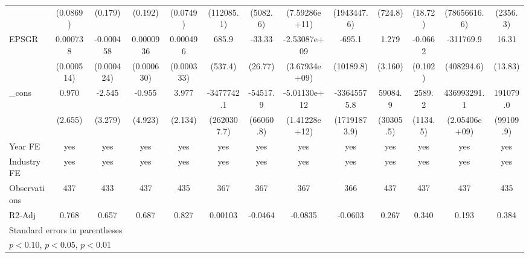 \begin{table}[htbp]
\begin{tabular}{l*{12}{c}}
                    &    (0.0869)         &     (0.179)         &     (0.192)         &    (0.0749)         &  (112085.1)         &    (5082.6)         &(7.59286e+11)         & (1943447.6)         &     (724.8)         &     (18.72)         &(78656616.6)         &    (2356.3)         \\
EPSGR               &    0.000738         &   -0.000458         &   0.0000936         &    0.000496         &       685.9         &      -33.33         &-2.53087e+09         &      -695.1         &       1.279         &     -0.0662         &   -311769.9         &       16.31         \\
                    &  (0.000514)         &  (0.000424)         &  (0.000630)         &  (0.000333)         &     (537.4)         &     (26.77)         &(3.67934e+09)         &   (10189.8)         &     (3.160)         &     (0.102)         &  (408294.6)         &     (13.83)         \\
\_cons              &       0.970         &      -2.545         &      -0.955         &       3.977\sym{*}  &  -3477742.1         &    -54517.9         &-5.01130e+12\sym{***}& -33645575.8\sym{*}  &     59084.9\sym{*}  &      2589.2\sym{**} & 436993291.1         &    191079.0\sym{*}  \\
                    &     (2.655)         &     (3.279)         &     (4.923)         &     (2.134)         & (2620307.7)         &   (66060.8)         &(1.41228e+12)         &(17191873.9)         &   (30305.5)         &    (1134.5)         &(2.05406e+09)         &   (99109.9)         \\
\hline
Year FE             &         yes         &         yes         &         yes         &         yes         &         yes         &         yes         &         yes         &         yes         &         yes         &         yes         &         yes         &         yes         \\
Industry FE         &         yes         &         yes         &         yes         &         yes         &         yes         &         yes         &         yes         &         yes         &         yes         &         yes         &         yes         &         yes         \\
Observations        &         437         &         433         &         437         &         435         &         367         &         367         &         367         &         366         &         437         &         437         &         437         &         435         \\
R2-Adj              &       0.768         &       0.657         &       0.687         &       0.827         &     0.00103         &     -0.0464         &     -0.0835         &     -0.0603         &       0.267         &       0.340         &       0.193         &       0.384         \\
\hline\hline
\multicolumn{13}{l}{\footnotesize Standard errors in parentheses}\\
\multicolumn{13}{l}{\footnotesize \sym{*} \(p<0.10\), \sym{**} \(p<0.05\), \sym{***} \(p<0.01\)}\\
\end{tabular}
\end{table}
